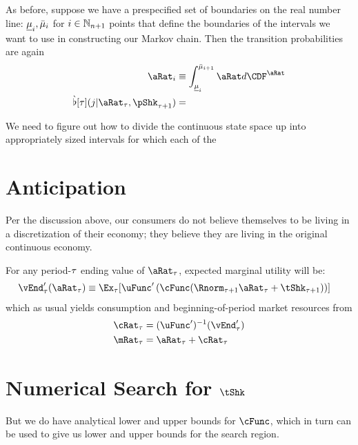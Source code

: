 \documentclass[\econtexRoot/BufferStockTheory.tex]{subfiles}
\begin{document}
As before, suppose we have a prespecified set of boundaries on the real number line: $\underline{\mu}_{i},\bar{\mu}_{i}$ for $i \in \mathbb{N}_{n+1}$ points that define the boundaries of the intervals we want to use in constructing our Markov chain.  Then the transition probabilities are again
\begin{align}
  \pnt_{\thisBin} & \equiv \int_{\Bot{\SetPartCnts}_{\thisBin}}^{\Top{\SetPartCnts}_{\thisBin+1}} \pnt d\CDF^{\pnt}
  \\ \Nxt{\PrbBinNxtFmPntNow}[\tAbs](\thatBin|\pnt_{\tAbs},\pShk_{\tAbs+1}) &= 
\end{align}



We need to figure out how to divide the continuous state space up into appropriately sized intervals for which each of the


\section{Anticipation}

Per the discussion above, our consumers do not believe themselves to be living in a discretization of their economy; they believe they are living in the original continuous economy.

For any period-$\tau$ ending value of $\pnt_{\tAbs}$, expected marginal utility will be:
\begin{align}
  \vEnd^{\prime}_{\tAbs}(\pnt_{\tAbs}) & \equiv \Ex_{\tAbs}[\uFunc^{\prime}\left(\cFunc(\Rnorm_{\tAbs+1} \pnt_{\tAbs} + \tShk_{\tAbs+1})\right)]
\end{align}
which as usual yields consumption and beginning-of-period market resources from
\begin{align}
  \cRat_{\tAbs} & = (\uFunc^{\prime})^{-1}(\vEnd^{\prime}_{\tAbs})
  \\ \mRat_{\tAbs} & = \pnt_{\tAbs}+\cRat_{\tAbs}
\end{align}

\pagebreak

\onlyinsubfile{}

\appendix

\section{Numerical Search for $\tShk$}

But we do have analytical lower and upper bounds for $\cFunc$, which in turn can be used to give us lower and upper bounds for the search region.
\begin{comment}
  \begin{align}
    \Nxt{\pnt}-\Nxt{\Rnorm} \pnt + \cFunc(\Nxt{\Rnorm}\pnt+\Nxt{\tShk})& = \Nxt{\tShk} 
  \end{align}
\end{comment}
\end{document}
